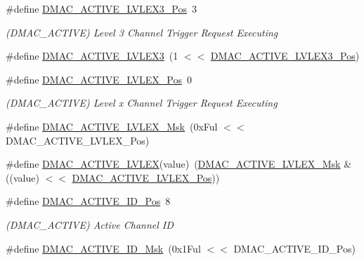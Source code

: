 \begin{DoxyCompactItemize}
\item 
\#define \mbox{\hyperlink{group___s_a_m_d21___d_m_a_c_gae26f46dc2736d41954454a101227df9a}{D\+M\+A\+C\+\_\+\+A\+C\+T\+I\+V\+E\+\_\+\+L\+V\+L\+E\+X3\+\_\+\+Pos}}~3
\begin{DoxyCompactList}\small\item\em (D\+M\+A\+C\+\_\+\+A\+C\+T\+I\+VE) Level 3 Channel Trigger Request Executing \end{DoxyCompactList}\item 
\#define \mbox{\hyperlink{group___s_a_m_d21___d_m_a_c_ga571edcaf14a9365b0d4676f0a8971d34}{D\+M\+A\+C\+\_\+\+A\+C\+T\+I\+V\+E\+\_\+\+L\+V\+L\+E\+X3}}~(1 $<$$<$ \mbox{\hyperlink{group___s_a_m_d21___d_m_a_c_gae26f46dc2736d41954454a101227df9a}{D\+M\+A\+C\+\_\+\+A\+C\+T\+I\+V\+E\+\_\+\+L\+V\+L\+E\+X3\+\_\+\+Pos}})
\item 
\#define \mbox{\hyperlink{group___s_a_m_d21___d_m_a_c_gac5780abfdb6bb43d0c84efa5f2bce1f8}{D\+M\+A\+C\+\_\+\+A\+C\+T\+I\+V\+E\+\_\+\+L\+V\+L\+E\+X\+\_\+\+Pos}}~0
\begin{DoxyCompactList}\small\item\em (D\+M\+A\+C\+\_\+\+A\+C\+T\+I\+VE) Level x Channel Trigger Request Executing \end{DoxyCompactList}\item 
\#define \mbox{\hyperlink{group___s_a_m_d21___d_m_a_c_gafd8dfe4cba0e6d4043a7a4597cadce59}{D\+M\+A\+C\+\_\+\+A\+C\+T\+I\+V\+E\+\_\+\+L\+V\+L\+E\+X\+\_\+\+Msk}}~(0x\+Ful $<$$<$ D\+M\+A\+C\+\_\+\+A\+C\+T\+I\+V\+E\+\_\+\+L\+V\+L\+E\+X\+\_\+\+Pos)
\item 
\#define \mbox{\hyperlink{group___s_a_m_d21___d_m_a_c_gab0c932d2456fbcccd370161d5b74b105}{D\+M\+A\+C\+\_\+\+A\+C\+T\+I\+V\+E\+\_\+\+L\+V\+L\+EX}}(value)~(\mbox{\hyperlink{group___s_a_m_d21___d_m_a_c_gafd8dfe4cba0e6d4043a7a4597cadce59}{D\+M\+A\+C\+\_\+\+A\+C\+T\+I\+V\+E\+\_\+\+L\+V\+L\+E\+X\+\_\+\+Msk}} \& ((value) $<$$<$ \mbox{\hyperlink{group___s_a_m_d21___d_m_a_c_gac5780abfdb6bb43d0c84efa5f2bce1f8}{D\+M\+A\+C\+\_\+\+A\+C\+T\+I\+V\+E\+\_\+\+L\+V\+L\+E\+X\+\_\+\+Pos}}))
\item 
\#define \mbox{\hyperlink{group___s_a_m_d21___d_m_a_c_ga4d1a17504745f9621931fd0d0938ba4f}{D\+M\+A\+C\+\_\+\+A\+C\+T\+I\+V\+E\+\_\+\+I\+D\+\_\+\+Pos}}~8
\begin{DoxyCompactList}\small\item\em (D\+M\+A\+C\+\_\+\+A\+C\+T\+I\+VE) Active Channel ID \end{DoxyCompactList}\item 
\#define \mbox{\hyperlink{group___s_a_m_d21___d_m_a_c_gaa2b4886798972a76de8e342202c0209f}{D\+M\+A\+C\+\_\+\+A\+C\+T\+I\+V\+E\+\_\+\+I\+D\+\_\+\+Msk}}~(0x1\+Ful $<$$<$ D\+M\+A\+C\+\_\+\+A\+C\+T\+I\+V\+E\+\_\+\+I\+D\+\_\+\+Pos)

\end{DoxyCompactItemize}
